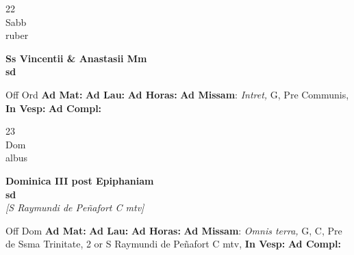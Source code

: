 \documentclass[10pt, openany]{book}
\begin{document}
        \begin{center}
            \begin{minipage}{3.5in}
                \vspace{2em}
                \begin{minipage}{0.5in}
                    {\Huge 22} \\
                    {\normalsize Sabb} \\
                    {\normalsize ruber}
                \end{minipage}
                \begin{minipage}{3.0in}
                    \textbf{ \large Ss Vincentii \& Anastasii Mm \\
                    \textnormal{\normalsize sd}} \\ 
                \end{minipage}
                \begin{justify}Off Ord
                    \textbf{Ad Mat: }
                    \textbf{Ad Lau: }
                    \textbf{Ad Horas: }\textbf{Ad Missam}: \textit{Intret,} G, Pre Communis,  
                    \textbf{In Vesp: }
                    \textbf{Ad Compl: }
                \end{justify}
            \end{minipage}
        \end{center}
    
        \begin{center}
            \begin{minipage}{3.5in}
                \vspace{2em}
                \begin{minipage}{0.5in}
                    {\Huge 23} \\
                    {\normalsize Dom} \\
                    {\normalsize albus}
                \end{minipage}
                \begin{minipage}{3.0in}
                    \textbf{ \large Dominica III post Epiphaniam \\
                    \textnormal{\normalsize sd}} \\ \textit{[S Raymundi de Peñafort C mtv]} \\ 
                \end{minipage}
                \begin{justify}Off Dom
                    \textbf{Ad Mat: }
                    \textbf{Ad Lau: }
                    \textbf{Ad Horas: }\textbf{Ad Missam}: \textit{Omnis terra,} G, C, Pre de Ssma Trinitate, 2 or S Raymundi de Peñafort C mtv,  
                    \textbf{In Vesp: }
                    \textbf{Ad Compl: }
                \end{justify}
            \end{minipage}
        \end{center}
    
\end{document}

